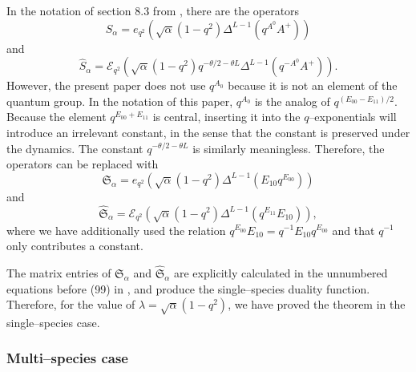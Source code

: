 \documentclass{ximera}
\begin{document}
In the notation of section 8.3 from \cite{CFG21}, there are the operators
\begin{equation*}
S_{\alpha}^{}=e_{q^{2}}\left(\sqrt{\alpha}\left(1-q^{2}\right) \Delta^{L-1}\left(q^{A^{0}} A^{+}\right)\right)
\end{equation*}
and
\begin{equation*}
\hat{S}_{\alpha}^{}=\mathcal{E}_{q^{2}}\left(\sqrt{\alpha}\left(1-q^{2}\right) q^{-\theta/2-\theta L}\Delta^{L-1}\left(q^{-A^{0}} A^{+}\right)\right).
\end{equation*}
 However, the present paper does not use $q^{A_0}$ because it is not an element of the quantum group. In the notation of this paper, $q^{A_0}$ is the analog of $q^{(E_{00}-E_{11})/2}$. Because the element $q^{E_{00}+E_{11}}$ is central,  inserting it into the $q$--exponentials will introduce an irrelevant constant, in the sense that the constant is preserved under the dynamics. The constant $q^{-\theta/2-\theta L}$ is similarly meaningless. Therefore, the operators can be replaced with 
\begin{equation*}
\mathfrak{S}_{\alpha}^{}=e_{q^{2}}\left(\sqrt{\alpha}\left(1-q^{2}\right) \Delta^{L-1}\left( E_{10}q^{E_{00}}\right)\right)
\end{equation*}
and
\begin{equation*}
\hat{\mathfrak{S}}_{\alpha}^{}=\mathcal{E}_{q^{2}}\left(\sqrt{\alpha}\left(1-q^{2}\right) \Delta^{L-1}\left(q^{E_{11}} E_{10}\right)\right),
\end{equation*}
where we have additionally used the relation $q^{E_{00}}E_{10}= q^{-1}E_{10}q^{E_{00}}$ and that $q^{-1}$ only contributes a constant.


The matrix entries of $\mathfrak{S}_{\alpha}$ and $\hat{\mathfrak{S}}_{\alpha}$ are explicitly calculated in the unnumbered equations before (99) in \cite{CFG21}, and produce the single--species duality function. Therefore, for the value of $\lambda = \sqrt{\alpha}(1-q^2)$, we have proved the theorem in the single--species case. 

\subsubsection{Multi--species case}
\end{document}
